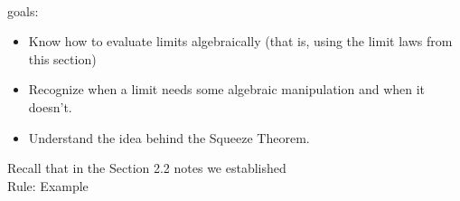 \documentclass[11pt,fleqn]{article}
\begin{document}
\renewcommand{\headrulewidth}{0pt}
\newcommand{\blank}[1]{\rule{#1}{0.75pt}}
\newcommand{\bc}{\begin{center}}
\newcommand{\ec}{\end{center}}
\renewcommand{\d}{\displaystyle}

\vspace*{-0.7in}

\begin{center}
  \large
  \\
\end{center}
goals:\\
\begin{itemize}
\item Know how to evaluate limits algebraically (that is, using the limit laws from this section)
\item Recognize when a limit needs some algebraic manipulation and when it doesn't.
\item Understand the idea behind the Squeeze Theorem.
\end{itemize}

Recall that in the Section 2.2 notes we established \quad \fbox{ $\d \lim_{x \to 0} \frac{\sin(x)}{x}=1.$}\\

Rule: \hfill Example\\
\end{document}
